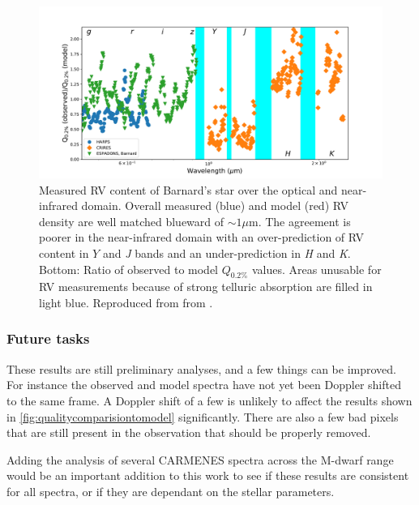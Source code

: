 \begin{figure}
    \centering
    \includegraphics[width=0.8\linewidth]{figures/information-content/artigau2018_figures/all_w2}
    \caption[Measured RV content of Barnard's star over the optical and near-infrared domain.]{Measured RV content of Barnard's star over the optical and near-infrared domain. Overall measured (blue) and model (red) RV density are well matched blueward of $\sim1\mu$m. The agreement is poorer in the near-infrared domain with an over-prediction of RV content in $Y$ and \emph{J} bands and an under-prediction in \emph{H} and \emph{K}.
        Bottom: Ratio of observed to model $Q_{0.2\%}$ values. Areas unusable for RV measurements because of strong telluric absorption are filled in light blue. Reproduced from from \citep{artigau_optical_2018}.}
    \label{fig:allw2}
\end{figure}




\subsubsection{Future tasks}
\label{subsubsec:future_tasksaims}
These results are still preliminary analyses, and a few things can be improved.
For instance the observed and model spectra have not yet been Doppler shifted to the same frame.
A Doppler shift of a few \nm{} is unlikely to affect the results shown in \cref{fig:qualitycomparisiontomodel} significantly.
There are also a few bad pixels that are still present in the observation that should be properly removed.

Adding the analysis of several CARMENES spectra across the M-dwarf range would be an important addition to this work to see if these results are consistent for all spectra, or if they are dependant on the stellar parameters.
